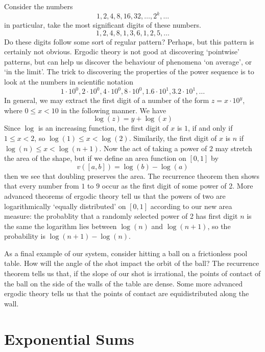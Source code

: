 \begin{example}
    Consider the numbers
    \[ 1, 2, 4, 8, 16, 32, \dots, 2^k, \dots \]
    in particular, take the most significant digits of these numbers.
    \[ 1, 2, 4, 8, 1, 3, 6, 1, 2, 5, \dots \]
    Do these digits follow some sort of regular pattern? Perhaps, but this pattern is certainly not obvious. Ergodic theory is not good at discovering `pointwise' patterns, but can help us discover the behaviour of phenomena `on average', or `in the limit'. The trick to discovering the properties of the power sequence is to look at the numbers in scientific notation
    \[ 1 \cdot 10^0, 2 \cdot 10^0, 4 \cdot 10^0, 8 \cdot 10^0, 1.6 \cdot 10^1, 3.2 \cdot 10^1, \dots \]
    In general, we may extract the first digit of a number of the form $z = x \cdot 10^y$, where $0 \leq x < 10$ in the following manner. We have
    \[ \log(z) = y + \log(x) \]
    Since $\log$ is an increasing function, the first digit of $x$ is $1$, if and only if $1 \leq x < 2$, so $\log(1) \leq x < \log(2)$. Similarily, the first digit of $x$ is $n$ if $\log(n) \leq x < \log(n+1)$. Now the act of taking a power of $2$ may stretch the area of the shape, but if we define an area function on $[0,1]$ by
    \[ v([a,b]) = \log(b) - \log(a) \]
    then we see that doubling preserves the area. The recurrence theorem then shows that every number from $1$ to $9$ occur as the first digit of some power of 2. More advanced theorems of ergodic theory tell us that the powers of two are logarithmically `equally distributed' on $[0,1]$ according to our new area measure: the probablity that a randomly selected power of 2 has first digit $n$ is the same the logarithm lies between $\log(n)$ and $\log(n+1)$, so the probability is $\log(n+1) - \log(n)$.
\end{example}

As a final example of our system, consider hitting a ball on a frictionless pool table. How will the angle of the shot impact the orbit of the ball? The recurrence theorem tells us that, if the slope of our shot is irrational, the points of contact of the ball on the side of the walls of the table are dense. Some more advanced ergodic theory tells us that the points of contact are equidistributed along the wall.

\section{Exponential Sums}

